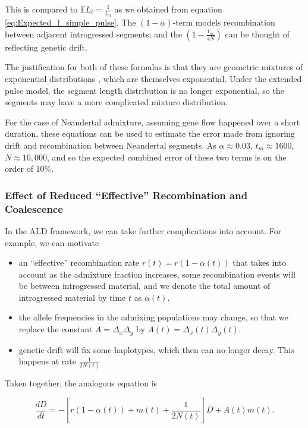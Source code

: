 \documentclass[11pt]{article}
\begin{document}
This is compared to $\mathbb{E}L_i = \frac{1}{t_m}$ as we obtained from equation \ref{eq:Expected_l_simple_pulse}.
The $(1-\alpha)$-term models recombination between adjacent introgressed segments; and the $\left(1-\frac{t_m}{4N}\right)$ can be thought of reflecting genetic drift. 

The justification for both of these formulas is that they are geometric mixtures of exponential distributions \citep{liang_lengths_2014}, which are themselves exponential. Under the extended pulse model, the segment length distribution is no longer exponential, so the segments may have a more complicated mixture distribution. 

For the case of Neandertal admixture, assuming gene flow happened over a short duration, these equations can be used to estimate the error made from ignoring drift and recombination between Neandertal segments. As $\alpha \approx 0.03$, $t_m \approx 1600$, $N \approx 10,000$, and so the expected combined error of these two terms is on the order of $10\%$.




\subsubsection{Effect of Reduced ``Effective'' Recombination and Coalescence}

In the ALD framework, we can take further complications into account. For example, we can motivate 
\begin{itemize}
    \item an ``effective'' recombination rate $r(t) = r (1-\alpha(t))$ that takes into account as the admixture fraction increases, some recombination events will be between introgressed material, and we denote the total amount of introgressed material by time $t$ as $\alpha(t)$.
    \item the allele frequencies in the admixing populations may change, so that we replace the constant $A=\Delta_x\Delta_y$ by $A(t)=\Delta_x(t)\Delta_y(t)$.
    \item genetic drift will fix some haplotypes, which then can no longer decay. This happens at rate $\frac{1}{2N(t)}$
\end{itemize} 

Taken together, the analogous equation is

\begin{equation}
    \frac{dD}{dt} = -\left[r(1-\alpha(t)) + m(t) +\frac{1}{2N(t)} \right] D + A(t) m(t)\text{.}
\end{equation}
\end{document}

